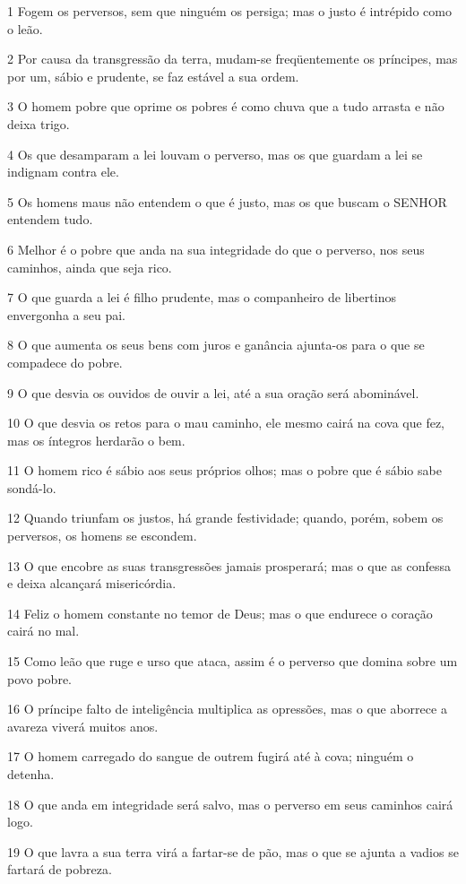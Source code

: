 \par 1 Fogem os perversos, sem que ninguém os persiga; mas o justo é intrépido como o leão.
\par 2 Por causa da transgressão da terra, mudam-se freqüentemente os príncipes, mas por um, sábio e prudente, se faz estável a sua ordem.
\par 3 O homem pobre que oprime os pobres é como chuva que a tudo arrasta e não deixa trigo.
\par 4 Os que desamparam a lei louvam o perverso, mas os que guardam a lei se indignam contra ele.
\par 5 Os homens maus não entendem o que é justo, mas os que buscam o SENHOR entendem tudo.
\par 6 Melhor é o pobre que anda na sua integridade do que o perverso, nos seus caminhos, ainda que seja rico.
\par 7 O que guarda a lei é filho prudente, mas o companheiro de libertinos envergonha a seu pai.
\par 8 O que aumenta os seus bens com juros e ganância ajunta-os para o que se compadece do pobre.
\par 9 O que desvia os ouvidos de ouvir a lei, até a sua oração será abominável.
\par 10 O que desvia os retos para o mau caminho, ele mesmo cairá na cova que fez, mas os íntegros herdarão o bem.
\par 11 O homem rico é sábio aos seus próprios olhos; mas o pobre que é sábio sabe sondá-lo.
\par 12 Quando triunfam os justos, há grande festividade; quando, porém, sobem os perversos, os homens se escondem.
\par 13 O que encobre as suas transgressões jamais prosperará; mas o que as confessa e deixa alcançará misericórdia.
\par 14 Feliz o homem constante no temor de Deus; mas o que endurece o coração cairá no mal.
\par 15 Como leão que ruge e urso que ataca, assim é o perverso que domina sobre um povo pobre.
\par 16 O príncipe falto de inteligência multiplica as opressões, mas o que aborrece a avareza viverá muitos anos.
\par 17 O homem carregado do sangue de outrem fugirá até à cova; ninguém o detenha.
\par 18 O que anda em integridade será salvo, mas o perverso em seus caminhos cairá logo.
\par 19 O que lavra a sua terra virá a fartar-se de pão, mas o que se ajunta a vadios se fartará de pobreza.
